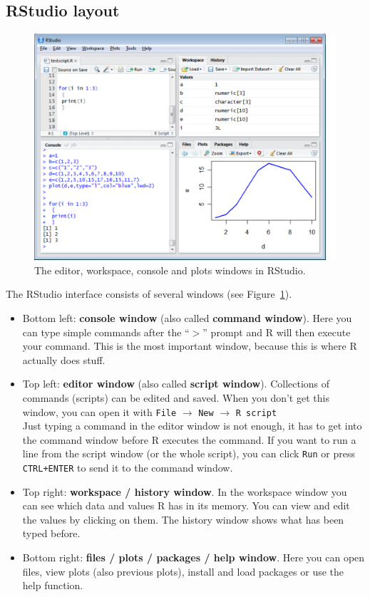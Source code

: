 \documentclass[a4paper,11pt,twocolumn,tablecaptionabove]{scrartcl} %
\begin{document}
\subsection{RStudio layout}

\begin{figure}[htb]
  \centering
  \includegraphics[width=13cm, clip=true, trim=0cm 0cm 9mm 0cm]{img/rstudio_screenshot.pdf}
  \caption{The editor, workspace, console and plots windows in RStudio.}
  \label{fig:screenshot}
\end{figure}

The RStudio interface consists of several windows (see Figure~\ref{fig:screenshot}). 
\begin{itemize}
\item Bottom left: \textbf{console window} (also called \textbf{command window}). Here you can type simple commands after the ``$>$'' prompt and R will then execute your command. This is the most important window, because this is where R actually does stuff. 
\item Top left: \textbf{editor window} (also called \textbf{script window}). Collections of commands (scripts) can be edited and saved. When you don't get this window, you can open it with \texttt{File} $\rightarrow$ \texttt{New} $\rightarrow$ \texttt{R script}\\
Just typing a command in the editor window is not enough, it has to get into the command window before R executes the command. If you want to run a line from the script window (or the whole script), you can click \texttt{Run} or press \texttt{CTRL+ENTER} to send it to the command window. 
\item Top right: \textbf{workspace / history window}. In the workspace window you can see which data and values R has in its memory. You can view and edit the values by clicking on them.
The history window shows what has been typed before. 
\item Bottom right: \textbf{files / plots / packages / help window}. Here you can open files, view plots (also previous plots), install and load packages or use the help function.
\end{itemize}
\end{document}
